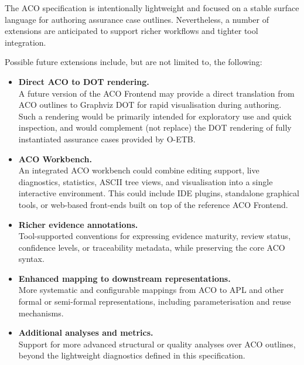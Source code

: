 \documentclass[11pt]{article}
\begin{document}
The ACO specification is intentionally lightweight and focused on a stable
surface language for authoring assurance case outlines. Nevertheless, a number
of extensions are anticipated to support richer workflows and tighter tool
integration.

Possible future extensions include, but are not limited to, the following:

\begin{itemize}[leftmargin=2em]
  \item \textbf{Direct ACO to DOT rendering.} \\
        A future version of the ACO Frontend may provide a direct translation
        from ACO outlines to Graphviz DOT for rapid visualisation during
        authoring. Such a rendering would be primarily intended for exploratory
        use and quick inspection, and would complement (not replace) the DOT
        rendering of fully instantiated assurance cases provided by O-ETB.

  \item \textbf{ACO Workbench.} \\
        An integrated ACO workbench could combine editing support, live
        diagnostics, statistics, ASCII tree views, and visualisation into a
        single interactive environment. This could include IDE plugins,
        standalone graphical tools, or web-based front-ends built on top of the
        reference ACO Frontend.

  \item \textbf{Richer evidence annotations.} \\
        Tool-supported conventions for expressing evidence maturity, review
        status, confidence levels, or traceability metadata, while preserving
        the core ACO syntax.

  \item \textbf{Enhanced mapping to downstream representations.} \\
        More systematic and configurable mappings from ACO to APL and other
        formal or semi-formal representations, including parameterisation and
        reuse mechanisms.

  \item \textbf{Additional analyses and metrics.} \\
        Support for more advanced structural or quality analyses over ACO
        outlines, beyond the lightweight diagnostics defined in this
        specification.
\end{itemize}
\end{document}
